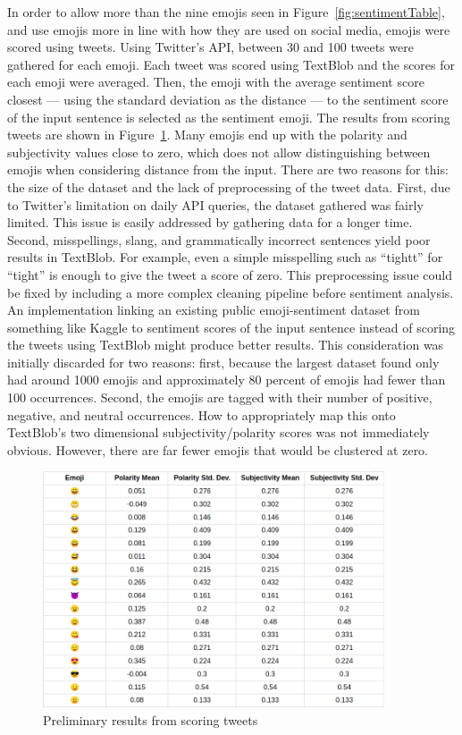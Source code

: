 \documentclass{article}[10]
\begin{document}
In order to allow more than the nine emojis seen in
Figure~{\ref{fig:sentimentTable}}, and use emojis more in line with how they are
used on social media, emojis were scored using tweets. Using Twitter's API,
between 30 and 100 tweets were gathered for each emoji. Each tweet was scored using
TextBlob and the scores for each emoji were averaged. Then, the emoji with the
average sentiment score closest --- using the standard deviation as the distance
--- to the sentiment score of the input sentence is selected as the sentiment
emoji. The results from scoring tweets are shown in
Figure~\ref{fig:tweetScoring}. Many emojis end up with the polarity and
subjectivity values close to zero, which does not allow distinguishing between
emojis when considering distance from the input. There are two reasons for this:
the size of the dataset and the lack of preprocessing of the tweet data. First, due to
Twitter's limitation on daily API queries, the dataset gathered was fairly limited. This issue is
easily addressed by gathering data for a longer time. Second, misspellings,
slang, and grammatically incorrect sentences yield poor results in TextBlob. For
example, even a simple misspelling such as ``tightt'' for ``tight'' is enough to
give the tweet a score of zero. This preprocessing issue could be fixed by
including a more complex cleaning pipeline before sentiment analysis. An implementation linking an existing public
emoji-sentiment dataset from something like Kaggle to sentiment scores of the
input sentence instead of scoring the tweets using TextBlob might produce better
results. This consideration was initially discarded for two reasons: first,
because the largest dataset found only had around 1000 emojis and approximately
80 percent of emojis had fewer than 100 occurrences. Second, the emojis are
tagged with their number of positive, negative, and neutral occurrences. How to
appropriately map this onto TextBlob's two dimensional subjectivity/polarity
scores was not immediately obvious. However, there are far fewer emojis that
would be clustered at zero.

\begin{figure}[h]
  \begin{center}
    \includegraphics[width=0.90\textwidth]{figures/sentiment_results1.png}
    \caption{Preliminary results from scoring tweets\label{fig:tweetScoring}}
  \end{center}
\end{figure}
\end{document}
